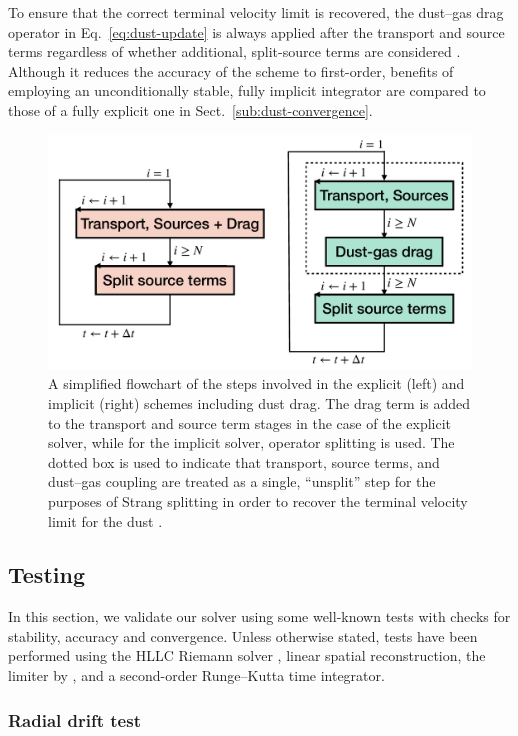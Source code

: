 \documentclass[fleqn,usenatbib,useAMS]{mnras}
\begin{document}
To ensure that the correct terminal velocity limit is recovered, the dust--gas drag operator in Eq.~\eqref{eq:dust-update} is always applied after the transport and source terms regardless of whether additional, split-source terms are considered \citep[][see also Fig.~\ref{fig:flowchart}]{booth-etal-2015}. Although it reduces the accuracy of the scheme to first-order, benefits of employing an unconditionally stable, fully implicit integrator are compared to those of a fully explicit one in Sect.~\ref{sub:dust-convergence}.
%
\begin{figure}
	\centering
	\includegraphics[width=\columnwidth]{flow.pdf}
	\caption{A simplified flowchart of the steps involved in the explicit (left) and implicit (right) schemes including dust drag. The drag term is added to the transport and source term stages in the case of the explicit solver, while for the implicit solver, operator splitting is used. The dotted box is used to indicate that transport, source terms, and dust--gas coupling are treated as a single, ``unsplit'' step for the purposes of Strang splitting in order to recover the terminal velocity limit for the dust \citep{booth-etal-2015}.}
	\label{fig:flowchart}
\end{figure}
\subsection{Testing}
In this section, we validate our solver using some well-known tests with checks for stability, accuracy and convergence. Unless otherwise stated, tests have been performed using the HLLC Riemann solver \citep{toro-etal-1994}, linear spatial reconstruction, the limiter by \citet{vanleer-1974}, and a second-order Runge--Kutta time integrator.


\subsubsection{Radial drift test}
\label{sub:dust-radial-drift}
\end{document}
